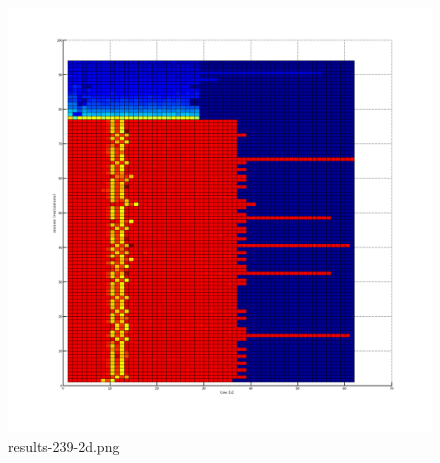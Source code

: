 \begin{figure}[htb]
	\begin{center}
	\includegraphics[width=\textwidth]{results-239-2d.png}
	\end{center}
	\caption{results-239-2d.png}
	\label{img:results-239-2d.png}
\end{figure}

